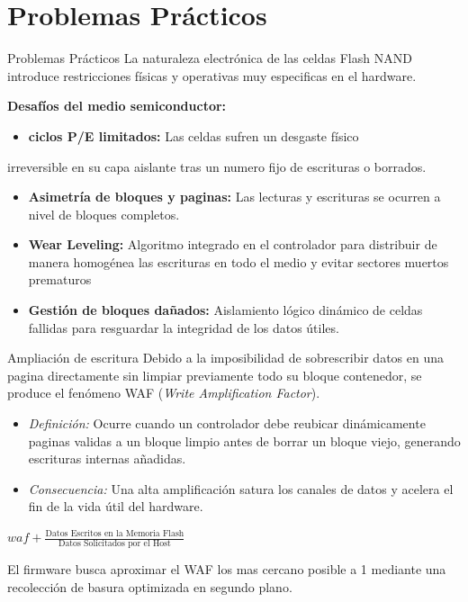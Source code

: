 \documentclass[presentation]{beamer}
\begin{document}
\section{Problemas Prácticos}
\label{sec:org4927741}
\begin{frame}[label={sec:org154a249},shrink=20]{Problemas Prácticos}
La naturaleza electrónica de las celdas Flash NAND introduce
restricciones físicas y operativas muy especificas en el hardware.

\textbf{Desafíos del medio semiconductor:}
\begin{itemize}
\item \textbf{ciclos P/E limitados:} Las celdas sufren un desgaste físico
\end{itemize}
irreversible en su capa aislante tras un numero fijo de escrituras o
borrados. 
\begin{itemize}
\item \textbf{Asimetría de bloques y paginas:} Las lecturas y escrituras
se ocurren a nivel de bloques completos.
\item \textbf{Wear Leveling:} Algoritmo integrado en el controlador para
distribuir de manera homogénea las escrituras en todo el medio y
evitar sectores muertos prematuros
\item \textbf{Gestión de bloques dañados:} Aislamiento lógico dinámico de
celdas fallidas para resguardar la integridad de los datos útiles.
\end{itemize}
\begin{block}{Ampliación de escritura}
Debido a la imposibilidad de sobrescribir datos en una pagina
directamente sin limpiar previamente todo su bloque contenedor, se
produce el fenómeno WAF (\textit{Write Amplification Factor}).

\begin{itemize}
\item \textit{Definición:} Ocurre cuando un controlador debe reubicar
dinámicamente paginas validas a un bloque limpio antes de borrar un
bloque viejo, generando escrituras internas añadidas.
\item \textit{Consecuencia:} Una alta amplificación satura los canales de
datos y acelera el fin de la vida útil del hardware. \\[0pt]
\end{itemize}

\vspace{0.3cm}
\hspace{3cm} \(waf + \frac{\text{Datos Escritos en la Memoria
Flash}}{\text{Datos Solicitados por el Host}}\)

\begin{definition}
El firmware busca aproximar el WAF los mas cercano posible a 1
mediante una recolección de basura optimizada en segundo plano.
\end{definition}
\end{block}
\end{frame}
\end{document}
